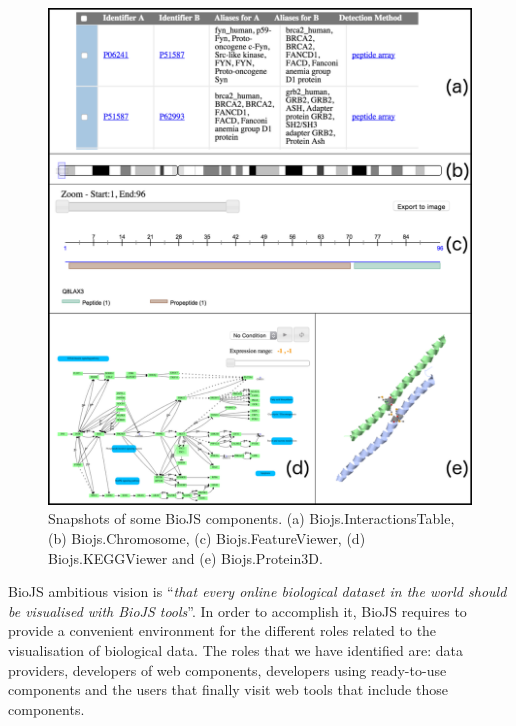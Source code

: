 \begin{figure}  
\centering
\includegraphics[width=\textwidth]{figures/biojs_components.png}
\caption[Snapshots of some BioJS components.]{Snapshots of some BioJS components. (a) Biojs.InteractionsTable, (b) Biojs.Chromosome, (c) Biojs.FeatureViewer, (d) Biojs.KEGGViewer and  (e) Biojs.Protein3D.
\label{fig:biojs_components}}
\end{figure}
 


BioJS ambitious vision is ``\emph{that every online biological dataset in the world should be visualised with BioJS tools}''. In order to accomplish it, BioJS requires to provide a convenient environment for the different roles related to the visualisation of biological data. The roles that we have identified are: data providers,  developers of web components, developers using ready-to-use components and the users that finally visit web tools that include those components.


